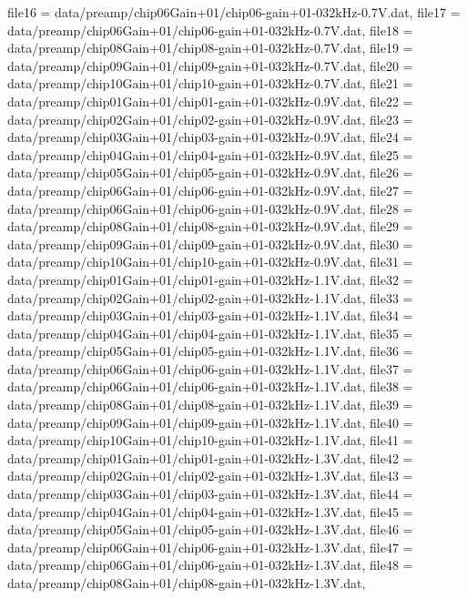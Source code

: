 {    file16         = data/preamp/chip06Gain+01/chip06-gain+01-032kHz-0.7V.dat,
    file17         = data/preamp/chip06Gain+01/chip06-gain+01-032kHz-0.7V.dat,
    file18         = data/preamp/chip08Gain+01/chip08-gain+01-032kHz-0.7V.dat,
    file19         = data/preamp/chip09Gain+01/chip09-gain+01-032kHz-0.7V.dat,
    file20         = data/preamp/chip10Gain+01/chip10-gain+01-032kHz-0.7V.dat,
    file21         = data/preamp/chip01Gain+01/chip01-gain+01-032kHz-0.9V.dat,
    file22         = data/preamp/chip02Gain+01/chip02-gain+01-032kHz-0.9V.dat,
    file23         = data/preamp/chip03Gain+01/chip03-gain+01-032kHz-0.9V.dat,
    file24         = data/preamp/chip04Gain+01/chip04-gain+01-032kHz-0.9V.dat,
    file25         = data/preamp/chip05Gain+01/chip05-gain+01-032kHz-0.9V.dat,
    file26         = data/preamp/chip06Gain+01/chip06-gain+01-032kHz-0.9V.dat,
    file27         = data/preamp/chip06Gain+01/chip06-gain+01-032kHz-0.9V.dat,
    file28         = data/preamp/chip08Gain+01/chip08-gain+01-032kHz-0.9V.dat,
    file29         = data/preamp/chip09Gain+01/chip09-gain+01-032kHz-0.9V.dat,
    file30         = data/preamp/chip10Gain+01/chip10-gain+01-032kHz-0.9V.dat,
    file31         = data/preamp/chip01Gain+01/chip01-gain+01-032kHz-1.1V.dat,
    file32         = data/preamp/chip02Gain+01/chip02-gain+01-032kHz-1.1V.dat,
    file33         = data/preamp/chip03Gain+01/chip03-gain+01-032kHz-1.1V.dat,
    file34         = data/preamp/chip04Gain+01/chip04-gain+01-032kHz-1.1V.dat,
    file35         = data/preamp/chip05Gain+01/chip05-gain+01-032kHz-1.1V.dat,
    file36         = data/preamp/chip06Gain+01/chip06-gain+01-032kHz-1.1V.dat,
    file37         = data/preamp/chip06Gain+01/chip06-gain+01-032kHz-1.1V.dat,
    file38         = data/preamp/chip08Gain+01/chip08-gain+01-032kHz-1.1V.dat,
    file39         = data/preamp/chip09Gain+01/chip09-gain+01-032kHz-1.1V.dat,
    file40         = data/preamp/chip10Gain+01/chip10-gain+01-032kHz-1.1V.dat,
    file41         = data/preamp/chip01Gain+01/chip01-gain+01-032kHz-1.3V.dat,
    file42         = data/preamp/chip02Gain+01/chip02-gain+01-032kHz-1.3V.dat,
    file43         = data/preamp/chip03Gain+01/chip03-gain+01-032kHz-1.3V.dat,
    file44         = data/preamp/chip04Gain+01/chip04-gain+01-032kHz-1.3V.dat,
    file45         = data/preamp/chip05Gain+01/chip05-gain+01-032kHz-1.3V.dat,
    file46         = data/preamp/chip06Gain+01/chip06-gain+01-032kHz-1.3V.dat,
    file47         = data/preamp/chip06Gain+01/chip06-gain+01-032kHz-1.3V.dat,
    file48         = data/preamp/chip08Gain+01/chip08-gain+01-032kHz-1.3V.dat,
}
